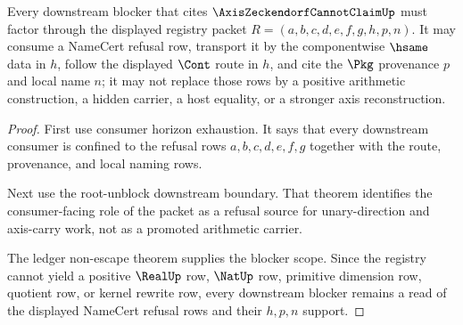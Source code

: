 \begin{theorem}
\label{thm:axis-zeckendorf-cannot-claim-downstream-blocker-scope}
Every downstream blocker that cites $\AxisZeckendorfCannotClaimUp$ must factor through the displayed registry packet $R=(a,b,c,d,e,f,g,h,p,n)$. It may consume a NameCert refusal row, transport it by the componentwise $\hsame$ data in $h$, follow the displayed $\Cont$ route in $h$, and cite the $\Pkg$ provenance $p$ and local name $n$; it may not replace those rows by a positive arithmetic construction, a hidden carrier, a host equality, or a stronger axis reconstruction.
\end{theorem}
\begin{proof}
First use consumer horizon exhaustion. It says that every downstream consumer is confined to the refusal rows $a,b,c,d,e,f,g$ together with the route, provenance, and local naming rows.

Next use the root-unblock downstream boundary. That theorem identifies the consumer-facing role of the packet as a refusal source for unary-direction and axis-carry work, not as a promoted arithmetic carrier.

The ledger non-escape theorem supplies the blocker scope. Since the registry cannot yield a positive $\RealUp$ row, $\NatUp$ row, primitive dimension row, quotient row, or kernel rewrite row, every downstream blocker remains a read of the displayed NameCert refusal rows and their $h,p,n$ support.
\end{proof}

